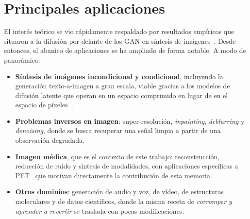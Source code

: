 

\section{Principales aplicaciones}
\label{sec:aplicaciones-difusion}

El interés teórico se vio rápidamente respaldado por resultados
empíricos que situaron a la difusión por delante de los GAN en
síntesis de imágenes~\cite{dhariwal2021beatgans}. Desde entonces, el
abanico de aplicaciones se ha ampliado de forma notable. A modo de
panorámica:

\begin{itemize}
    \item \textbf{Síntesis de imágenes incondicional y condicional},
    incluyendo la generación texto-a-imagen a gran escala, viable
    gracias a los modelos de difusión latente que operan en un espacio
    comprimido en lugar de en el espacio de píxeles~\cite{rombach2022ldm}.
    \item \textbf{Problemas inversos en imagen}: super-resolución,
    \textit{inpainting}, \textit{deblurring} y \emph{denoising}, donde
    se busca recuperar una señal limpia a partir de una observación
    degradada.
    \item \textbf{Imagen médica}, que es el contexto de este trabajo:
    reconstrucción, reducción de ruido y síntesis de modalidades, con
    aplicaciones específicas a PET~\cite{scorepet2024,ddpmpet2023} que
    motivan directamente la contribución de esta memoria.
    \item \textbf{Otros dominios}: generación de audio y voz, de vídeo,
    de estructuras moleculares y de datos científicos, donde la misma
    receta de \emph{corromper y aprender a revertir} se traslada con
    pocas modificaciones.
\end{itemize}

